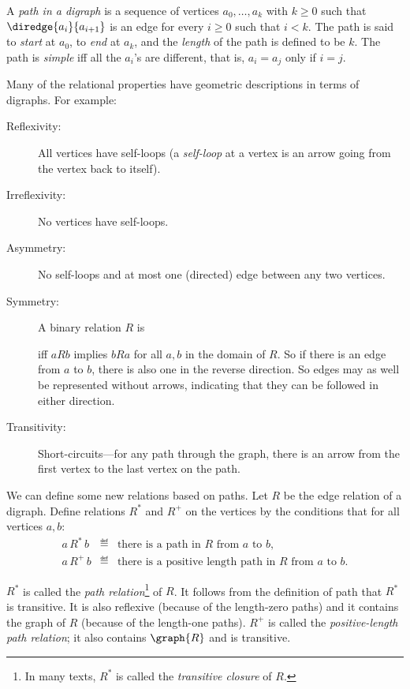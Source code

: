 \begin{definition}
A \emph{path in a digraph} is a sequence of vertices $a_0,\dots,a_k$ with
$k \ge 0$ such that $\diredge{a_i}{a_{i+1}}$ is an edge for every $i \geq
0$ such that $i < k$.  The path is said to \emph{start} at $a_0$, to
\emph{end} at $a_k$, and the \emph{length} of the path is defined to be
$k$.  The path is \emph{simple} iff all the $a_i$'s are different, that
is, $a_i = a_j$ only if $i=j$.
\end{definition}

Many of the relational properties have geometric descriptions in terms of
digraphs.  For example:
\begin{description}

\item[Reflexivity:] All vertices have self-loops (a \emph{self-loop} at a
vertex is an arrow going from the vertex back to itself).

\item[Irreflexivity:] No vertices have self-loops.

\item[Asymmetry:] No self-loops and at most one (directed) edge between
any two vertices.

\item[Symmetry:] A binary relation $R$ is
 iff $aRb$ implies $bRa$ for
all $a,b$ in the domain of $R$.  So if there is an edge from $a$ to $b$,
there is also one in the reverse direction.  So edges may as well be
represented without arrows, indicating that they can be followed in either
direction.

\item[Transitivity:] Short-circuits---for any path through the graph,
there is an arrow from the first vertex to the last vertex on the path.
\end{description}

We can define some new relations based on paths.  Let $R$ be the edge
relation of a digraph.  Define relations $R^*$ and $R^+$ on the vertices
by the conditions that for all vertices $a,b$:
\begin{eqnarray*}
a\, R^*\, b &\eqdef& \mbox{there is a path in $R$ from $a$ to $b$},\\
a\, R^+\, b &\eqdef& \mbox{there is a positive length path in $R$ from $a$ to $b$}.
\end{eqnarray*}

$R^*$ is called the \emph{path relation}\footnote{In many texts, $R^*$ is
called the \emph{transitive closure} of $R$.} of $R$.  It follows from the
definition of path that $R^*$ is transitive.  It is also reflexive
(because of the length-zero paths) and it contains the graph of $R$
(because of the length-one paths).  $R^+$ is called the
\emph{positive-length path relation}; it also contains $\graph{R}$ and is
transitive.

